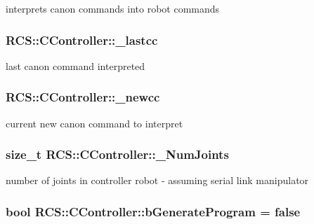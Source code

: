 interprets canon commands into robot commands \hypertarget{structRCS_1_1CController_a042ac2e4f8765bf58abed979afd2ba20}{
\subsubsection[{\-\_\-lastcc}]{ R\-C\-S\-::\-C\-Controller\-::\-\_\-lastcc}}\label{structRCS_1_1CController_a042ac2e4f8765bf58abed979afd2ba20}
last canon command interpreted \hypertarget{structRCS_1_1CController_adb6c26898d07eb95d78cb4a9c3b32f5e}{
\subsubsection[{\-\_\-newcc}]{ R\-C\-S\-::\-C\-Controller\-::\-\_\-newcc}}\label{structRCS_1_1CController_adb6c26898d07eb95d78cb4a9c3b32f5e}
current new canon command to interpret \hypertarget{structRCS_1_1CController_a9b155c29a4fbb8b1a36dada1417126ff}{
\subsubsection[{\-\_\-\-Num\-Joints}]{\setlength{\rightskip}{0pt plus 5cm}size\-\_\-t R\-C\-S\-::\-C\-Controller\-::\-\_\-\-Num\-Joints\hspace{0.3cm}{\ttfamily [static]}}}\label{structRCS_1_1CController_a9b155c29a4fbb8b1a36dada1417126ff}
number of joints in controller robot -\/ assuming serial link manipulator \hypertarget{structRCS_1_1CController_a5b5e83348fbf18e362a59a2d96668466}{
\subsubsection[{b\-Generate\-Program}]{\setlength{\rightskip}{0pt plus 5cm}bool R\-C\-S\-::\-C\-Controller\-::b\-Generate\-Program = false\hspace{0.3cm}{\ttfamily [static]}}}\label{structRCS_1_1CController_a5b5e83348fbf18e362a59a2d96668466}
